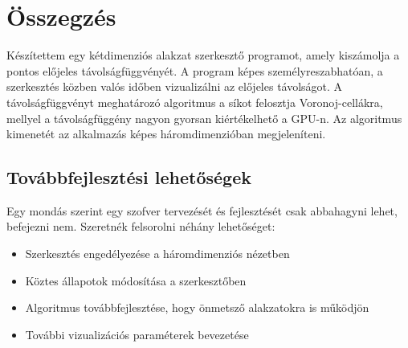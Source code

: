 \chapter{Összegzés}
\label{ch:sum}


Készítettem egy kétdimenziós alakzat szerkesztő programot, amely kiszámolja a pontos előjeles távolságfüggvényét. A program képes személyreszabhatóan, a szerkesztés közben valós időben vizualizálni az előjeles távolságot. A távolságfüggvényt meghatározó algoritmus a síkot felosztja Voronoj-cellákra, mellyel a távolságfüggény nagyon gyorsan kiértékelhető a GPU-n. Az algoritmus kimenetét az alkalmazás képes háromdimenzióban megjeleníteni.


\section{Továbbfejlesztési lehetőségek}

Egy mondás szerint egy szofver tervezését és fejlesztését csak abbahagyni lehet, befejezni nem. Szeretnék felsorolni néhány lehetőséget:

\begin{itemize}
    \item Szerkesztés engedélyezése a háromdimenziós nézetben
    \item Köztes állapotok módosítása a szerkesztőben
    \item Algoritmus továbbfejlesztése, hogy önmetsző alakzatokra is működjön
    \item További vizualizációs paraméterek bevezetése
\end{itemize}
